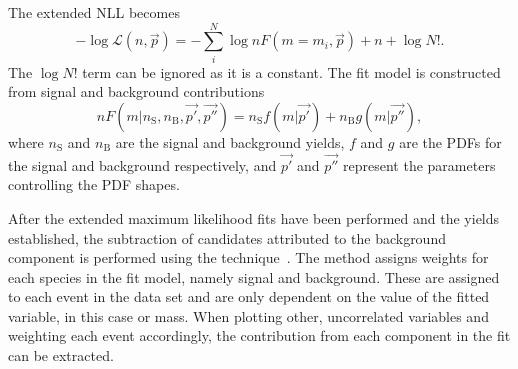 The extended NLL becomes 
\begin{equation}
-\log\mathcal{L}(n,\vec{p}) = -\sum_{i}^{N} \log n F(m=m_{i},\vec{p}) + n + \log N!.
\end{equation}
The $\log N!$ term can be ignored as it is a constant.
The fit model is constructed from signal and background contributions 
\begin{equation}
n F(m| n_{\text{S}},n_{\text{B}},\vec{p'},\vec{p''}) = n_{\text{S}} f(m|\vec{p'}) + n_{\text{B}} g(m|\vec{p''}),
\end{equation}
where $n_{\text{S}}$ and $n_{\text{B}}$ are the signal and background yields, $f$ and $g$ are the PDFs for the signal and background respectively, and $\vec{p'}$ and $\vec{p''}$ represent the parameters controlling the PDF shapes.

After the extended maximum likelihood fits have been performed and the yields established, the subtraction of candidates attributed to the background component is performed using the \sPlot technique~\cite{Pivk:2004ty}.
The \sPlot method assigns weights for each species in the fit model, namely signal and background. These are assigned to each event in the data set and are only dependent on the value of the fitted variable, in this case \phiz or \Dsp mass. When plotting other, uncorrelated variables and weighting each event accordingly, the contribution from each component in the fit can be extracted. 

